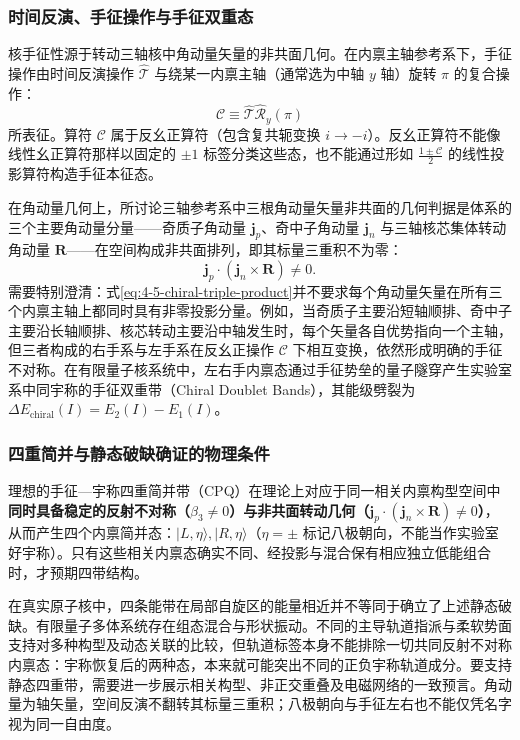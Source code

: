\subsubsection{时间反演、手征操作与手征双重态}

核手征性源于转动三轴核中角动量矢量的非共面几何。在内禀主轴参考系下，手征操作由时间反演操作 $\hat{\mathcal{T}}$ 与绕某一内禀主轴（通常选为中轴 $y$ 轴）旋转 $\pi$ 的复合操作：
\begin{equation}\label{eq:4-5-chiral-op}
\mathcal{C} \equiv \hat{\mathcal{T}} \hat{\mathcal{R}}_y(\pi)
\end{equation}
所表征。算符 $\mathcal{C}$ 属于反幺正算符（包含复共轭变换 $i \to -i$）。反幺正算符不能像线性幺正算符那样以固定的 $\pm1$ 标签分类这些态，也不能通过形如 $\frac{1 \pm \mathcal{C}}{2}$ 的线性投影算符构造手征本征态。

在角动量几何上，所讨论三轴参考系中三根角动量矢量非共面的几何判据是体系的三个主要角动量分量——奇质子角动量 $\mathbf{j}_p$、奇中子角动量 $\mathbf{j}_n$ 与三轴核芯集体转动角动量 $\mathbf{R}$——在空间构成非共面排列，即其标量三重积不为零：
\begin{equation}\label{eq:4-5-chiral-triple-product}
\mathbf{j}_p \cdot (\mathbf{j}_n \times \mathbf{R}) \neq 0.
\end{equation}
需要特别澄清：式\eqref{eq:4-5-chiral-triple-product}并不要求每个角动量矢量在所有三个内禀主轴上都同时具有非零投影分量。例如，当奇质子主要沿短轴顺排、奇中子主要沿长轴顺排、核芯转动主要沿中轴发生时，每个矢量各自优势指向一个主轴，但三者构成的右手系与左手系在反幺正操作 $\mathcal{C}$ 下相互变换，依然形成明确的手征不对称。在有限量子核系统中，左右手内禀态通过手征势垒的量子隧穿产生实验室系中同宇称的手征双重带（Chiral Doublet Bands），其能级劈裂为 $\Delta E_{\text{chiral}}(I) = E_2(I) - E_1(I)$。

\subsubsection{四重简并与静态破缺确证的物理条件}

理想的手征---宇称四重简并带（CPQ）在理论上对应于同一相关内禀构型空间中\textbf{同时具备稳定的反射不对称（$\beta_3 \neq 0$）与非共面转动几何（$\mathbf{j}_p \cdot (\mathbf{j}_n \times \mathbf{R}) \neq 0$）}，从而产生四个内禀简并态：$|L,\eta\rangle,|R,\eta\rangle$（$\eta=\pm$ 标记八极朝向，不能当作实验室好宇称）。只有这些相关内禀态确实不同、经投影与混合保有相应独立低能组合时，才预期四带结构。

在真实原子核中，四条能带在局部自旋区的能量相近并不等同于确立了上述静态破缺。有限量子多体系统存在组态混合与形状振动。不同的主导轨道指派与柔软势面支持对多种构型及动态关联的比较，但轨道标签本身不能排除一切共同反射不对称内禀态：宇称恢复后的两种态，本来就可能突出不同的正负宇称轨道成分。要支持静态四重带，需要进一步展示相关构型、非正交重叠及电磁网络的一致预言。角动量为轴矢量，空间反演不翻转其标量三重积；八极朝向与手征左右也不能仅凭名字视为同一自由度。

